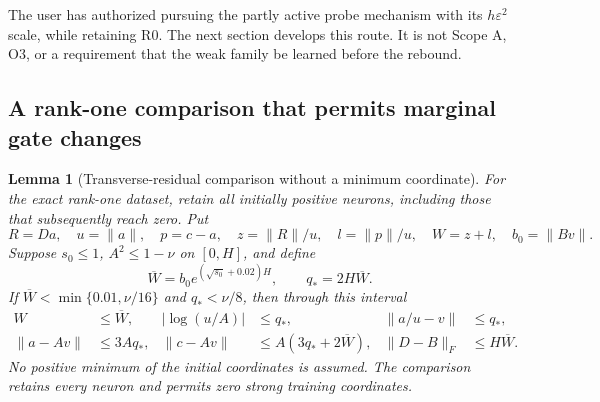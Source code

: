 \documentclass[11pt]{article}
\newtheorem{lemma}[theorem]{Lemma}
\theoremstyle{remark}
\begin{document}
The user has authorized pursuing the partly active probe mechanism with
its $h\varepsilon^2$ scale, while retaining R0. The next section develops
this route. It is not Scope A, O3, or a requirement that the weak family
be learned before the rebound.

\subsection{A rank-one comparison that permits marginal gate changes}

\begin{lemma}[Transverse-residual comparison without a minimum coordinate]
\label{sbquant:residual-comparison}
For the exact rank-one dataset, retain all initially positive neurons,
including those that subsequently reach zero. Put
\[
 R=Da,\quad u=\|a\|,\quad p=c-a,\quad
 z=\|R\|/u,\quad l=\|p\|/u,\quad W=z+l,
 \quad b_0=\|Bv\|.
\]
Suppose $s_0\le1$, $A^2\le1-\nu$ on $[0,H]$, and define
\[
 \overline W=b_0e^{(\sqrt{s_0}+0.02)H},\qquad
 q_*=2H\overline W.
\]
If $\overline W<\min\{0.01,\nu/16\}$ and $q_*<\nu/8$, then
through this interval
\begin{align}
 W&\le\overline W,&
 |\log(u/A)|&\le q_*,&
 \|a/u-v\|&\le q_*,\label{sbquant:residual-controls}\\
 \|a-Av\|&\le3Aq_*,&
 \|c-Av\|&\le A(3q_*+2\overline W),&
 \|D-B\|_F&\le H\overline W.\nonumber
\end{align}
No positive minimum of the initial coordinates is assumed. The comparison
retains every neuron and permits zero strong training coordinates.
\end{lemma}
\end{document}
